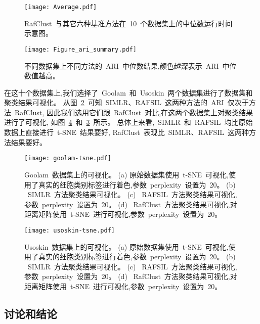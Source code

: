   \begin{figure}[!htbp]
    \centering
    \texttt{[image: Average.pdf]}
    \caption{
    RafClust~与其它六种基准方法在~10~个数据集上的中位数运行时间示意图。
    }
    \label{fig:running-summary}
\end{figure}

\begin{figure}[!htbp]
    \centering
    \texttt{[image: Figure\_ari\_summary.pdf]}
    \caption{
    不同数据集上不同方法的~ARI~中位数结果,颜色越深表示~ARI~中位数值越高。
    }
    \label{fig:rafari}
\end{figure}

在这十个数据集上,我们选择了~Goolam~和~Usoskin~两个数据集进行了数据集和聚类结果可视化。
从图~\ref{fig:rafari}~可知~SIMLR、RAFSIL~这两种方法的~ARI~仅次于方法~RafClust,
因此我们选用它们跟~RafClust~对比,在这两个数据集上对聚类结果进行了可视化, 
如图~\ref{fig:usoskin-tsne}~和~\ref{fig:goolam-tsne}~所示。
总体上来看,~SIMLR~和~RAFSIL~均比原始数据上直接进行~t-SNE~结果要好,
RafClust~表现比~SIMLR、RAFSIL~这两种方法结果要好。

\begin{figure}[!htbp]
  \centering
  \texttt{[image: goolam-tsne.pdf]}
  \caption{
  Goolam~数据集上的可视化。
  (a) 原始数据集使用~t-SNE~可视化,使用了真实的细胞类别标签进行着色,参数~perplexity~设置为~20。
  (b) ~SIMLR~方法聚类结果可视化。
  (c) ~RAFSIL~方法聚类结果可视化,参数~perplexity~设置为~20。
  (d) ~RafClust~方法聚类结果可视化,对距离矩阵使用~t-SNE~进行可视化,参数~perplexity~设置为~20。
  }
  \label{fig:goolam-tsne}
\end{figure}


\begin{figure}[!htbp]
  \centering
  \texttt{[image: usoskin-tsne.pdf]}
  \caption{
  Usoskin~数据集上的可视化。
  (a) 原始数据集使用~t-SNE~可视化,使用了真实的细胞类别标签进行着色,参数~perplexity~设置为~20。
  (b) ~SIMLR~方法聚类结果可视化。
  (c) ~RAFSIL~方法聚类结果可视化,参数~perplexity~设置为~20。
  (d) ~RafClust~方法聚类结果可视化,对距离矩阵使用~t-SNE~进行可视化,参数~perplexity~设置为~20。
  }
  \label{fig:usoskin-tsne}
\end{figure}

\subsection{讨论和结论}

